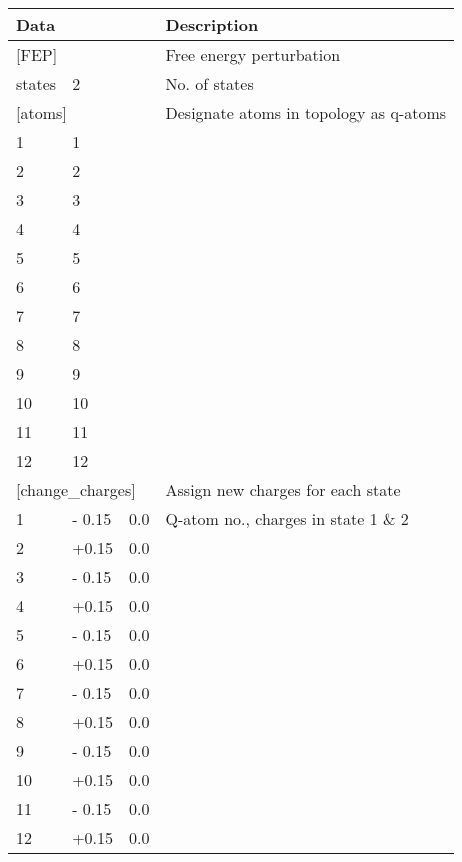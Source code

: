 \documentclass[a4paper,11pt]{article}
\begin{document}
\begin{longtable}{|p{30pt} p{30pt} p{30pt}|p{280pt}|}
  \hline \textbf{Data}    &    &     & \textbf{Description} \\
  \endhead
  \hline \multicolumn{3}{|l|}{[FEP]}   & Free energy perturbation \\
  \hline states  & 2     &     & No. of states \\
  \hline \multicolumn{3}{|l|}{[atoms]} & Designate atoms in topology as q-atoms \\
  \hline 1       & 1     &     & \\
  \hline 2       & 2     &     & \\
  \hline 3       & 3     &     & \\
  \hline 4       & 4     &     & \\
  \hline 5       & 5     &     & \\
  \hline 6       & 6     &     & \\
  \hline 7       & 7     &     & \\
  \hline 8       & 8     &     & \\
  \hline 9       & 9     &     & \\
  \hline 10      & 10    &     & \\
  \hline 11      & 11    &     & \\
  \hline 12      & 12    &     & \\
  \hline \multicolumn{3}{|l|}{[change{\_}charges]} & Assign new charges for each state \\
  \hline 1       & - 0.15 & 0.0 & Q-atom no., charges in state 1 \& 2 \\
  \hline 2       & +0.15  & 0.0 & \\
  \hline 3       & - 0.15 & 0.0 & \\
  \hline 4       & +0.15  & 0.0 & \\
  \hline 5       & - 0.15 & 0.0 & \\
  \hline 6       & +0.15  & 0.0 & \\
  \hline 7       & - 0.15 & 0.0 & \\
  \hline 8       & +0.15  & 0.0 & \\
  \hline 9       & - 0.15 & 0.0 & \\
  \hline 10      & +0.15  & 0.0 & \\
  \hline 11      & - 0.15 & 0.0 & \\
  \hline 12      & +0.15  & 0.0 & \\ \hline
\end{longtable}
\end{document}
